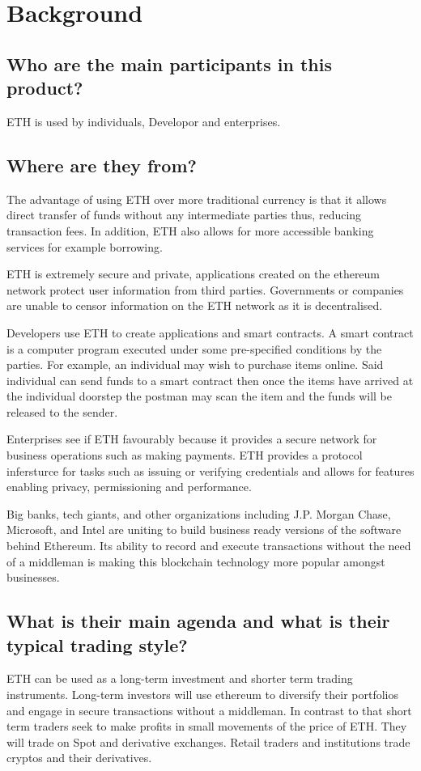 \chapter{Background}
\label{back}
\section{ Who are the main participants in this product?}
ETH is used by individuals, Developor and enterprises.
\section{ Where are they from?}
The advantage of using ETH over more traditional currency is that it allows direct transfer of funds without any intermediate parties thus, reducing transaction fees. In addition, ETH also allows for more accessible banking services for example borrowing. 

ETH is extremely secure and private, applications created on the ethereum network protect user information from third parties. Governments or companies are unable to censor information on the ETH network as it is decentralised.

Developers use ETH to create applications and smart contracts. A smart contract is a computer program executed under some pre-specified conditions by the parties. For example, an individual may wish to purchase items online. Said individual can send funds to a smart contract then once the items have arrived at the individual doorstep the postman may scan the item and the funds will be released to the sender.

Enterprises see if ETH favourably because it provides a secure network for business operations such as making payments. ETH provides a protocol infersturce for tasks such as issuing or verifying credentials and allows for features enabling privacy, permissioning and performance.  \cite{eth}

Big banks, tech giants, and other organizations including J.P. Morgan Chase, Microsoft, and Intel are uniting to build business ready versions of the software behind Ethereum. Its ability to record and execute transactions without the need of a middleman is making this blockchain technology more popular amongst businesses. \cite{avatrade_2020}
 
\section{ What is their main agenda and what is their typical trading style?}
ETH can be used as a long-term investment and shorter term trading instruments.  Long-term investors will use ethereum to diversify their portfolios and engage in secure transactions without a middleman. In contrast to that short term traders seek to make profits in small movements of the price of ETH.  They will trade on Spot and derivative exchanges. Retail traders and institutions trade cryptos and their derivatives.

